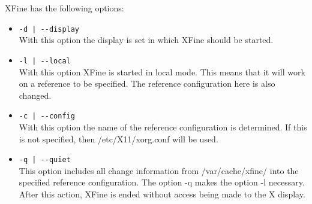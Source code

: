 XFine has the following options:
\begin{itemize}
\item \verb+-d | --display+\\
      With this option the display is set in which 
      XFine should be started.
\item \verb+-l | --local+\\
      With this option XFine is started in local mode.
      This means that it will work on a reference to be specified. The
      reference configuration here is also changed.
\item \verb+-c | --config+\\
      With this option the name of the reference configuration is determined. 
      If this is not specified, then /etc/X11/xorg.conf will be used.
\item \verb+-q | --quiet+\\
      This option includes all change information from 
      /var/cache/xfine/ into the specified reference configuration. The
      option  -q makes the option -l necessary.
      After this action,  XFine is ended without access being made to the 
      X display.
\end{itemize}


